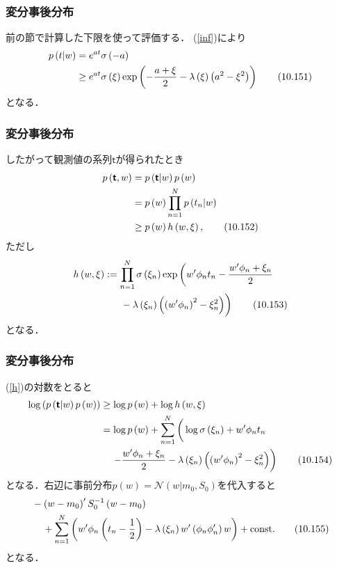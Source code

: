 \documentclass[10pt,hyperref={unicode}]{beamer}
\newcommand{\paref}[1]{{\fontfamily{cmr}\selectfont (\ref{#1})}}
\newcommand{\parentheses}[1]{\left(#1\right)}
\newcommand{\const}{\mathrm{const.}}
\begin{document}
\begin{frame}
\frametitle{変分事後分布}
前の節で計算した下限を使って評価する．
\paref{inf}により
\begin{align}
    p\parentheses{t|w}
    &= e^{at}\sigma\parentheses{-a} \notag \\
    &\geq e^{at} \sigma\parentheses{\xi}\exp\parentheses{-\frac{a + \xi}{2} - \lambda\parentheses{\xi}\parentheses{a^2 - \xi^2}} \tag{10.151}
\end{align}
となる．
\end{frame}

\begin{frame}
\frametitle{変分事後分布}
したがって観測値の系列$\bm{\mathsf{t}}$が得られたとき
\begin{align}
    p\parentheses{\bm{\mathsf{t}},w}
    &= p\parentheses{\bm{\mathsf{t}}|w}p\parentheses{w} \notag \\
    &= p\parentheses{w} \prod_{n = 1}^N p\parentheses{t_n|w} \notag \\
    &\geq p\parentheses{w} h\parentheses{w,\xi}, \tag{10.152}
\end{align}
ただし
\begin{align}
    h\parentheses{w,\xi} &:= \prod_{n = 1}^N \sigma\parentheses{\xi_n}\exp\left( w'\phi_n t_n -\frac{w'\phi_n + \xi_n}{2}\right. \notag \\
                         &\phantom{:=}\ \left. \vphantom{\frac{w'\phi_n + \xi_n}{2}}
    - \lambda\parentheses{\xi_n}\parentheses{\parentheses{w'\phi_n}^2 - \xi_n^2}\right) \tag{10.153} \label{h}
\end{align}
となる．
\end{frame}

\begin{frame}
\frametitle{変分事後分布}
\paref{h}の対数をとると
\begin{align}
    \log\parentheses{p\parentheses{\bm{\mathsf{t}}|w}p\parentheses{w}}
    &\geq \log p\parentheses{w} + \log h\parentheses{w,\xi} \notag \\
    &= \log p\parentheses{w} + \sum_{n = 1}^N \left(\vphantom{\frac{w'\phi_n + \xi_n}{2}}  \log \sigma\parentheses{\xi_n} + w'\phi_n t_n \right. \notag \\
    &\phantom{\geq}\ \left.   - \frac{w'\phi_n + \xi_n}{2}  - \lambda \parentheses{\xi_n}\parentheses{\parentheses{w'\phi_n}^2 - \xi_n^2}\right) \tag{10.154}
\end{align}
となる．右辺に事前分布$p\parentheses{w} = \mathcal{N}\parentheses{w|m_0,S_0}$を代入すると
\begin{align}
    &- \parentheses{w - m_0}'S_0^{-1}\parentheses{w - m_0} \notag \\
    &\phantom{-}\ + \sum_{n = 1}^N \parentheses{w'\phi_n\parentheses{t_n - \frac{1}{2}}
      - \lambda\parentheses{\xi_n}w'\parentheses{\phi_n\phi_n'}w} + \const \tag{10.155} \label{g}
\end{align}
となる．
\end{frame}
\end{document}
